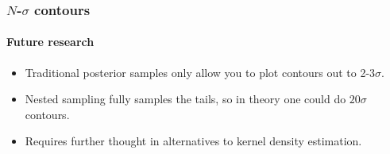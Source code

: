 \documentclass[%
]{beamer}
\begin{document}
\begin{frame}
    \frametitle{$N$-$\sigma$ contours}
    \framesubtitle{Future research}
    \begin{itemize}
        \item Traditional posterior samples only allow you to plot contours out to 2-3$\sigma$.
        \item Nested sampling fully samples the tails, so in theory one could do $20\sigma$ contours.
        \item Requires further thought in alternatives to kernel density estimation.
    \end{itemize}
\end{frame}



\end{document}
